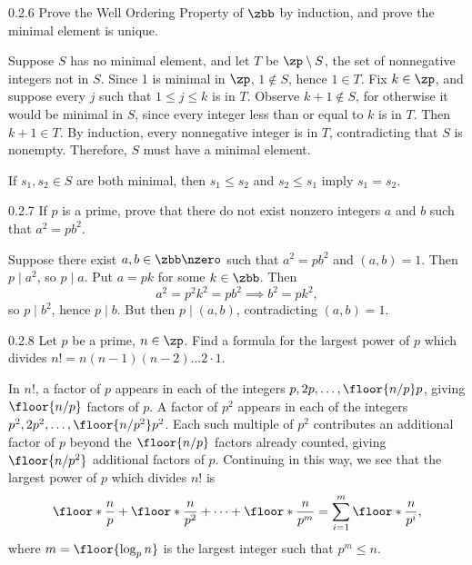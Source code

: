 \begin{exercise}{0.2.6}
    Prove the Well Ordering Property of $\zbb$ by induction, and prove the minimal element is unique.
\end{exercise}

\begin{sol}
    Suppose $S$ has no minimal element, and let $T$ be $\zp \setminus S$, the set of nonnegative integers not in $S$.
	Since 1 is minimal in $\zp$, $1 \notin S$, hence $1 \in T$.
	Fix $k \in \zp$, and suppose every $j$ such that $1 \leq j \leq k$ is in $T$.
	Observe $k + 1 \notin S$, for otherwise it would be minimal in $S$, since every integer less than or equal to $k$ is in $T$.
	Then $k + 1 \in T$.
	By induction, every nonnegative integer is in $T$, contradicting that $S$ is nonempty.
	Therefore, $S$ must have a minimal element.

    If $s_1, s_2 \in S$ are both minimal, then $s_1 \leq s_2$ and $s_2 \leq s_1$ imply $s_1 = s_2$.
\end{sol}

\begin{exercise}{0.2.7}
    If $p$ is a prime, prove that there do not exist nonzero integers $a$ and $b$ such that $a^2 = pb^2$.
\end{exercise}

\begin{sol}
    Suppose there exist $a, b \in \zbb \nzero$ such that $a^2 = pb^2$ and $(a, b) = 1$.
    Then $p \mid a^2$, so $p \mid a$.
    Put $a = pk$ for some $k \in \zbb$.
    Then
    \[
        a^2 = p^2k^2 = pb^2 \implies b^2 = pk^2,
    \]
    so $p \mid b^2$, hence $p \mid b$.
    But then $p \mid (a, b)$, contradicting $(a, b) = 1$.
\end{sol}

\begin{spex}{0.2.8}
    Let $p$ be a prime, $n \in \zp$.
	Find a formula for the largest power of $p$ which divides $n! = n(n - 1)(n - 2) \ldots 2 \cdot 1$.

\end{spex}

\begin{sol}[spsol]
    In $n!$, a factor of $p$ appears in each of the integers $p, 2p, \ldots, \floor{n/p}p$, giving $\floor{n/p}$ factors of $p$.
    A factor of $p^2$ appears in each of the integers $p^2, 2p^2, \ldots, \floor{n/p^2}p^2$.
    Each such multiple of $p^2$ contributes an additional factor of $p$ beyond the $\floor{n/p}$ factors already counted, giving $\floor{n/p^2}$ additional factors of $p$.
    Continuing in this way, we see that the largest power of $p$ which divides $n!$ is
    \[
        \floor*{\frac np} + \floor*{\frac{n}{p^2}} + \cdots + \floor*{\frac{n}{p^m}} = \sum_{i=1}^m \floor*{\frac{n}{p^i}},
    \]
    where $m = \floor{\log_p n}$ is the largest integer such that $p^m \leq n$.
\end{sol}

